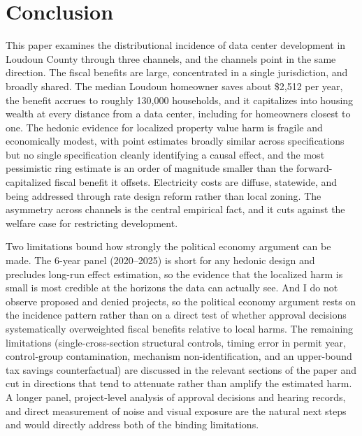 \documentclass[12pt]{article}
\begin{document}
\section{Conclusion}
\label{sec:conclusion}

This paper examines the distributional incidence of data center development in Loudoun County through three channels, and the channels point in the same direction. The fiscal benefits are large, concentrated in a single jurisdiction, and broadly shared. The median Loudoun homeowner saves about \$2,512 per year, the benefit accrues to roughly 130,000 households, and it capitalizes into housing wealth at every distance from a data center, including for homeowners closest to one. The hedonic evidence for localized property value harm is fragile and economically modest, with point estimates broadly similar across specifications but no single specification cleanly identifying a causal effect, and the most pessimistic ring estimate is an order of magnitude smaller than the forward-capitalized fiscal benefit it offsets. Electricity costs are diffuse, statewide, and being addressed through rate design reform rather than local zoning. The asymmetry across channels is the central empirical fact, and it cuts against the welfare case for restricting development.

Two limitations bound how strongly the political economy argument can be made. The 6-year panel (2020--2025) is short for any hedonic design and precludes long-run effect estimation, so the evidence that the localized harm is small is most credible at the horizons the data can actually see. And I do not observe proposed and denied projects, so the political economy argument rests on the incidence pattern rather than on a direct test of whether approval decisions systematically overweighted fiscal benefits relative to local harms. The remaining limitations (single-cross-section structural controls, timing error in permit year, control-group contamination, mechanism non-identification, and an upper-bound tax savings counterfactual) are discussed in the relevant sections of the paper and cut in directions that tend to attenuate rather than amplify the estimated harm. A longer panel, project-level analysis of approval decisions and hearing records, and direct measurement of noise and visual exposure are the natural next steps and would directly address both of the binding limitations.
\end{document}
